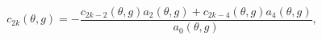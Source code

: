 \begin{equation}
c_{2k}(\theta ,g)=-\frac{c_{2k-2}(\theta ,g)a_{2}(\theta ,g)+c_{2k-4}(\theta
,g)a_{4}(\theta ,g)}{a_{0}(\theta ,g)},
\end{equation}

